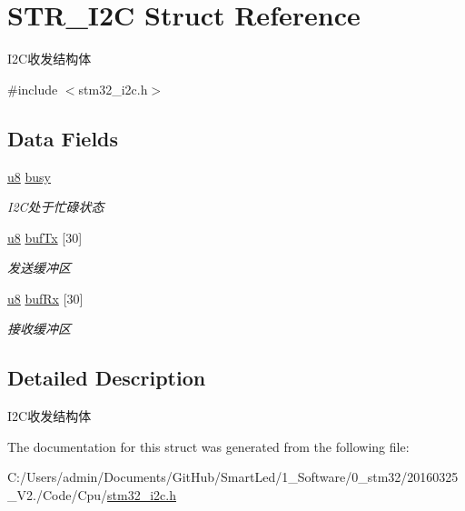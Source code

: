 \hypertarget{struct_s_t_r___i2_c}{\section{\-S\-T\-R\-\_\-\-I2\-C \-Struct \-Reference}
\label{struct_s_t_r___i2_c}
}


\-I2\-C收发结构体  




{\ttfamily \#include $<$stm32\-\_\-i2c.\-h$>$}

\subsection*{\-Data \-Fields}
\begin{DoxyCompactItemize}
\item 
\hypertarget{struct_s_t_r___i2_c_a1d41a2e0fbc5b759ca6bceaa2951c387}{\hyperlink{group___b_s_p_gaed742c436da53c1080638ce6ef7d13de}{u8} \hyperlink{struct_s_t_r___i2_c_a1d41a2e0fbc5b759ca6bceaa2951c387}{busy}}\label{struct_s_t_r___i2_c_a1d41a2e0fbc5b759ca6bceaa2951c387}

\begin{DoxyCompactList}\small\item\em \-I2\-C处于忙碌状态 \end{DoxyCompactList}\item 
\hypertarget{struct_s_t_r___i2_c_a9871aed563293c2ece8b424e1d91848f}{\hyperlink{group___b_s_p_gaed742c436da53c1080638ce6ef7d13de}{u8} \hyperlink{struct_s_t_r___i2_c_a9871aed563293c2ece8b424e1d91848f}{buf\-Tx} \mbox{[}30\mbox{]}}\label{struct_s_t_r___i2_c_a9871aed563293c2ece8b424e1d91848f}

\begin{DoxyCompactList}\small\item\em 发送缓冲区 \end{DoxyCompactList}\item 
\hypertarget{struct_s_t_r___i2_c_abfc6ec3d4a1f17bbed0691cb3ef29a04}{\hyperlink{group___b_s_p_gaed742c436da53c1080638ce6ef7d13de}{u8} \hyperlink{struct_s_t_r___i2_c_abfc6ec3d4a1f17bbed0691cb3ef29a04}{buf\-Rx} \mbox{[}30\mbox{]}}\label{struct_s_t_r___i2_c_abfc6ec3d4a1f17bbed0691cb3ef29a04}

\begin{DoxyCompactList}\small\item\em 接收缓冲区 \end{DoxyCompactList}\end{DoxyCompactItemize}


\subsection{\-Detailed \-Description}
\-I2\-C收发结构体 

\-The documentation for this struct was generated from the following file\-:\begin{DoxyCompactItemize}
\item 
\-C\-:/\-Users/admin/\-Documents/\-Git\-Hub/\-Smart\-Led/1\-\_\-\-Software/0\-\_\-stm32/20160325\-\_\-\-V2./\-Code/\-Cpu/\hyperlink{stm32__i2c_8h}{stm32\-\_\-i2c.\-h}\end{DoxyCompactItemize}
